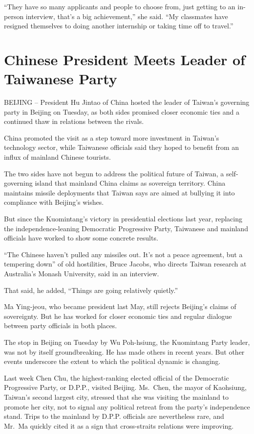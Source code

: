 \documentclass[12pt,a4paper,onecolumn]{article}
\begin{document}
``They have so many applicants and people to choose from, just getting to an in-person interview,
that's a big achievement,'' she said. ``My classmates have resigned themselves to doing another
internship or taking time off to travel.''

\section{Chinese President Meets Leader of Taiwanese Party}

BEIJING -- President Hu Jintao of China hosted the leader of Taiwan's governing party in Beijing on
Tuesday, as both sides promised closer economic ties and a continued thaw in relations between the
rivals.

China promoted the visit as a step toward more investment in Taiwan's technology sector, while
Taiwanese officials said they hoped to benefit from an influx of mainland Chinese tourists.

The two sides have not begun to address the political future of Taiwan, a self-governing island that
mainland China claims as sovereign territory. China maintains missile deployments that Taiwan says
are aimed at bullying it into compliance with Beijing's wishes.

But since the Kuomintang's victory in presidential elections last year, replacing the
independence-leaning Democratic Progressive Party, Taiwanese and mainland officials have worked to
show some concrete results.

``The Chinese haven't pulled any missiles out. It's not a peace agreement, but a tempering down'' of
old hostilities, Bruce Jacobs, who directs Taiwan research at Australia's Monash University, said in
an interview.

That said, he added, ``Things are going relatively quietly.''

Ma Ying-jeou, who became president last May, still rejects Beijing's claims of sovereignty. But he
has worked for closer economic ties and regular dialogue between party officials in both places.

The stop in Beijing on Tuesday by Wu Poh-hsiung, the Kuomintang Party leader, was not by itself
groundbreaking. He has made others in recent years. But other events underscore the extent to which
the political dynamic is changing.

Last week Chen Chu, the highest-ranking elected official of the Democratic Progressive Party, or
D.P.P., visited Beijing. Ms.~Chen, the mayor of Kaohsiung, Taiwan's second largest city, stressed
that she was visiting the mainland to promote her city, not to signal any political retreat from the
party's independence stand. Trips to the mainland by D.P.P. officials are nevertheless rare, and
Mr.~Ma quickly cited it as a sign that cross-straits relations were improving.
\end{document}
